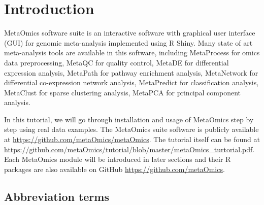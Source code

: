 \section{Introduction}
 
MetaOmics software suite is an interactive software with graphical user interface (GUI) for genomic meta-analysis implemented using R Shiny.
Many state of art meta-analysis tools are available in this software,
including MetaProcess for omics data preprocessing, 
MetaQC for quality control, 
MetaDE for differential expression analysis,
MetaPath for pathway enrichment analysis,
MetaNetwork for differential co-expression network analysis,
MetaPredict for classification analysis,
MetaClust for sparse clustering analysis,
MetaPCA for principal component analysis.

In this tutorial, 
we will go through installation and usage of MetaOmics step by step using real data examples.
The MetaOmics suite software is publicly available at \url{https://github.com/metaOmics/metaOmics}.
The tutorial itself can be found at \url{https://github.com/metaOmics/tutorial/blob/master/metaOmics_turtorial.pdf}.
Each MetaOmics module will be introduced in later sections and their R packages are also available on GitHub \url{https://github.com/metaOmics}.


\subsection{Abbreviation terms}

